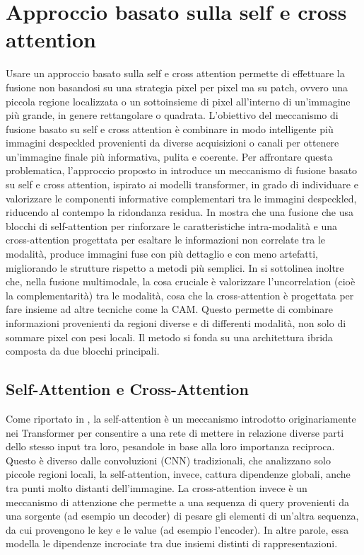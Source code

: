 \section{Approccio basato sulla self e cross attention}
Usare un approccio basato sulla self e cross attention permette di effettuare la fusione non basandosi su una strategia 
pixel per pixel ma su patch, ovvero 
una piccola regione localizzata o un sottoinsieme di pixel all'interno di 
un'immagine più grande, in genere rettangolare o quadrata.
L’obiettivo del meccanismo di fusione basato su self e cross attention è combinare 
in modo intelligente più immagini despeckled provenienti da diverse acquisizioni o canali per ottenere un’immagine finale più informativa, pulita e coerente. 
Per affrontare questa problematica, l’approccio proposto in \cite{li2024crossfuse} introduce un meccanismo di fusione basato su self e cross attention, ispirato ai modelli 
transformer, in grado di individuare e valorizzare le componenti informative complementari tra le immagini despeckled, riducendo al contempo la ridondanza residua.
In \cite{li2024crossfuse} mostra che una 
fusione che usa blocchi di self-attention per rinforzare le caratteristiche intra-modalità  
e una cross-attention progettata per esaltare le informazioni non correlate tra le modalità, produce immagini 
fuse con più dettaglio e con meno artefatti, migliorando le strutture rispetto a metodi più semplici. 
In \cite{li2024crossfuse} si sottolinea inoltre che, nella fusione multimodale, la cosa cruciale è valorizzare l’uncorrelation (cioè la complementarità) tra le modalità, 
cosa che la cross-attention è progettata per fare insieme ad altre tecniche come la CAM. Questo permette di combinare 
informazioni provenienti da regioni diverse e di differenti modalità, non solo di sommare pixel con pesi locali. 
Il metodo si fonda su una architettura ibrida composta da due blocchi principali.

\subsection{Self-Attention e Cross-Attention}
Come riportato in \cite{vaswani2023attentionneed}, la self-attention è un meccanismo introdotto originariamente nei Transformer per consentire a 
una rete di mettere in relazione diverse parti dello stesso input tra loro, pesandole in base alla loro importanza reciproca.
Questo è diverso dalle convoluzioni (CNN) tradizionali, che analizzano solo piccole regioni locali, la self-attention, invece, 
cattura dipendenze globali, anche tra punti molto distanti dell’immagine. La cross-attention \cite{vaswani2023attentionneed} invece 
è un meccanismo di attenzione che permette a una sequenza di query provenienti da una sorgente 
(ad esempio un decoder) di pesare gli elementi di un’altra sequenza, da cui provengono le key e le value (ad esempio l’encoder).
In altre parole, essa modella le dipendenze incrociate tra due insiemi distinti di rappresentazioni.
